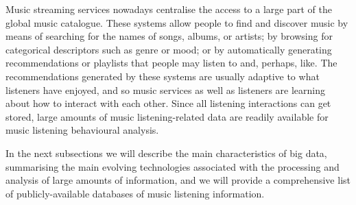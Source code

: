 

Music streaming services nowadays centralise the access to a large part of the global music catalogue. These systems allow people to find and discover music by means of searching for the names of songs, albums, or artists; by browsing for categorical descriptors such as genre or mood; or by automatically generating recommendations or playlists that people may listen to and, perhaps, like. 
The recommendations generated by these systems are usually adaptive to what listeners have enjoyed, and so music services as well as listeners are learning about how to interact with each other.
Since all listening interactions can get stored, large amounts of music listening-related data are readily available for music listening behavioural analysis. 




In the next subsections we will describe the main characteristics of big data, summarising the main evolving technologies associated with the processing and analysis of large amounts of information, and we will provide a comprehensive list of publicly-available databases of music listening information.


